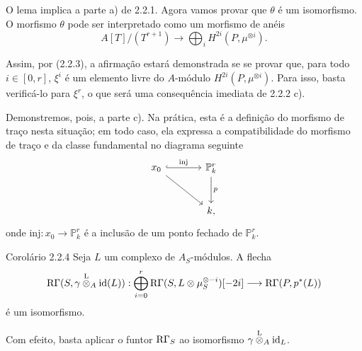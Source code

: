O lema implica a parte a) de 2.2.1. Agora vamos provar que $\theta$ é um isomorfismo. O morfismo $\theta$ pode ser interpretado como um morfismo de anéis
\[
A[T]/(T^{r+1})\longrightarrow\bigoplus_i H^{2i}(P,\mu^{\otimes i}).
\]


Assim, por (2.2.3), a afirmação estará demonstrada se se provar que, para todo $i\in[0,r]$, $\xi^i$ é um elemento livre do $A$-módulo $H^{2i}(P,\mu^{\otimes i})$. Para isso, basta verificá-lo para $\xi^r$, o que será uma consequência imediata de 2.2.2 c).

Demonstremos, pois, a parte c). Na prática, esta é a definição do morfismo de traço nesta situação; em todo caso, ela expressa a compatibilidade do morfismo de traço e da classe fundamental no diagrama seguinte
\[
\begin{tikzcd}[column sep=large,row sep=large]
x_0 \arrow[r,hook,"\mathrm{inj}"] \arrow[dr] & \mathbb P^r_k \arrow[d,"p"]\\
& k ,
\end{tikzcd}
\]
onde $\mathrm{inj}:x_0\to \mathbb P^r_k$ é a inclusão de um ponto fechado de $\mathbb P^r_k$.

\begin{statement}{Corolário 2.2.4}
Seja $L$ um complexo de $A_S$-módulos. A flecha
\[
\mathrm{R}\Gamma(S,\gamma\overset{\mathrm L}{\otimes}_A\mathrm{id}(L)):
\bigoplus_{i=0}^r \mathrm{R}\Gamma(S,L\otimes\mu_S^{\otimes -i})[-2i]
\longrightarrow
\mathrm{R}\Gamma(P,p^*(L))
\]
é um isomorfismo.
\end{statement}

Com efeito, basta aplicar o funtor $\mathrm{R}\Gamma_S$ ao isomorfismo $\gamma\overset{\mathrm L}{\otimes}_A\mathrm{id}_L$.
